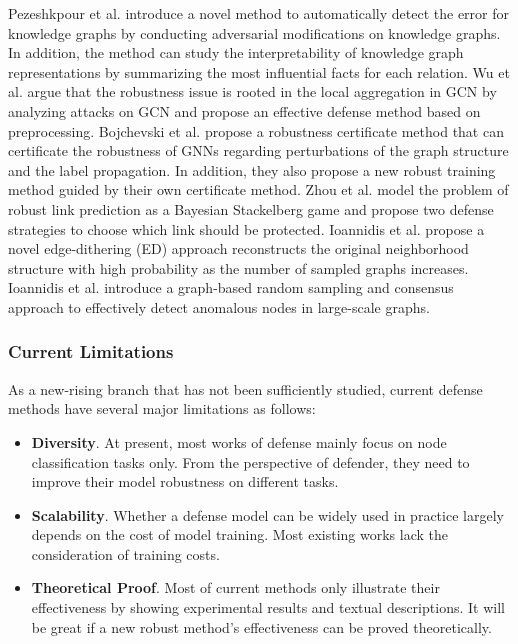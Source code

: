 Pezeshkpour et al. \cite{pezeshkpour2019investigating} introduce a novel method to automatically detect the error for knowledge graphs by conducting adversarial modifications on knowledge graphs. In addition, the method can study the interpretability of knowledge graph representations by summarizing the most influential facts for each relation.
Wu et al. \cite{wu2019adversarial} argue that the robustness issue is rooted in the local aggregation in GCN by analyzing attacks on GCN and propose an effective defense method based on preprocessing.
Bojchevski et al. \cite{bojchevski2019certifiable} propose a robustness certificate method that can certificate the robustness of GNNs regarding perturbations of the graph structure and the label propagation. In addition, they also propose a new robust training method guided by their own certificate  method.
Zhou et al. \cite{zhou2019adversarial} model the problem of robust link prediction as a Bayesian Stackelberg game \cite{von2010market} and propose two defense strategies to choose which link should be protected.
Ioannidis et al. \cite{ioannidis2019edge} propose a novel edge-dithering (ED) approach reconstructs the original neighborhood structure with high probability as the number of sampled graphs increases.
Ioannidis et al. \cite{ioannidis2019graphsac} introduce a graph-based random sampling and consensus approach to effectively detect anomalous nodes in large-scale graphs.

\subsubsection{Current Limitations}
As a new-rising branch that has not been sufficiently studied, current defense methods have several major limitations as follows:
\begin{itemize}
	\item \textbf{Diversity}. At present, most works of defense mainly focus on node classification tasks only. From the perspective of defender, they need to improve their model robustness on different tasks.
	\item \textbf{Scalability}. Whether a defense model can be widely used in practice largely depends on the cost of model training. Most existing works lack the consideration of training costs.
	\item \textbf{Theoretical Proof}. Most of current methods only illustrate their effectiveness by showing experimental results and textual descriptions. It will be great if a new robust method's effectiveness can be proved theoretically.
\end{itemize}